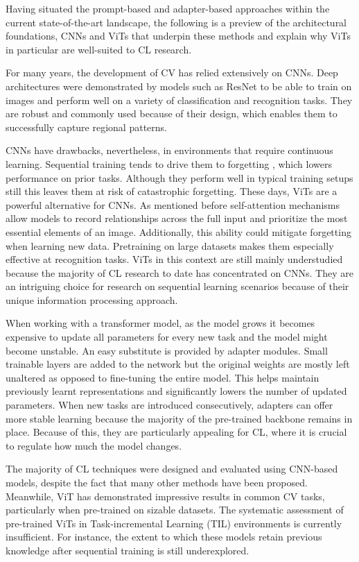 \documentclass[english, LaM, oneside]{sapthesis}%
\numberwithin{equation}{chapter}
\begin{document}
Having situated the prompt-based and adapter-based approaches within the current state-of-the-art landscape, the following is a preview of the architectural foundations, CNNs and ViTs that underpin these methods and explain why ViTs in particular are well-suited to CL research.

For many years, the development of CV has relied extensively on CNNs\cite{13}. Deep architectures were demonstrated by models such as ResNet\cite{3} to be able to train on images and perform well on a variety of classification and recognition tasks. They are robust and commonly used because of their design, which enables them to successfully capture regional patterns.

CNNs have drawbacks, nevertheless, in environments that require continuous learning. Sequential training tends to drive them to forgetting , which lowers performance on prior tasks. Although they perform well in typical training setups still this leaves them at risk of catastrophic forgetting\cite{14}.
These days, ViTs are a powerful alternative for CNNs\cite{4}. As mentioned before self-attention mechanisms allow models to record relationships across the full input and prioritize the most essential elements of an image. Additionally, this ability could mitigate forgetting when learning new data\cite{5}. Pretraining on large datasets makes them especially effective at recognition tasks. ViTs in this context are still mainly understudied because the majority of CL research to date has concentrated on CNNs. They are an intriguing choice for research on sequential learning scenarios because of their unique information processing approach.

When working with a transformer model, as the model grows it becomes expensive to update all parameters for every new task and the model might become unstable\cite{15}. An easy substitute is provided by adapter modules. Small trainable layers are added to the network but the original weights are mostly left unaltered as opposed to fine-tuning the entire model\cite{15}. This helps maintain previously learnt representations and significantly lowers the number of updated parameters. When new tasks are introduced consecutively, adapters can offer more stable learning because the majority of the pre-trained backbone remains in place. Because of this, they are particularly appealing for CL, where it is crucial to regulate how much the model changes.

The majority of CL techniques were designed and evaluated using CNN-based models, despite the fact that many other methods have been proposed\cite{6}. Meanwhile, ViT has demonstrated impressive results in common CV tasks, particularly when pre-trained on sizable datasets. The systematic assessment of pre-trained ViTs in Task-incremental Learning (TIL) environments is currently insufficient\cite{5}. For instance, the extent to which these models retain previous knowledge after sequential training is still underexplored.
\end{document}
